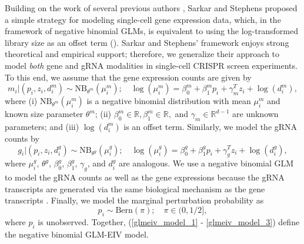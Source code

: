 \documentclass[12pt]{article}
\begin{document}
Building on the work of several previous authors \parencite{Townes2019,Svensson2020,Hafemeister2019}, Sarkar and Stephens proposed a simple strategy for modeling single-cell gene expression data, which, in the framework of negative binomial GLMs, is equivalent to using the log-transformed library size as an offset term (\cite{Sarkar2021}). Sarkar and Stephens' framework enjoys strong theoretical and empirical support; therefore, we generalize their approach to model \textit{both} gene and gRNA modalities in single-cell CRISPR screen experiments. To this end, we assume that the gene expression counts are given by
\begin{equation}\label{glmeiv_model_1}
m_i |(p_i, z_i, d^m_i) \sim \textrm{NB}_{\theta^m}(\mu_i^m); \quad \log(\mu^m_i) = \beta^m_0 + \beta^m_1 p_i + \gamma_m^T z_i + \log(d^m_i),
\end{equation}
where (i) $\textrm{NB}_{\theta^m}(\mu^m_i)$ is a negative binomial distribution with mean $\mu^m_i$ and known size parameter $\theta^m$; (ii) $\beta^m_0 \in \mathbb{R}, \beta^m_1 \in \mathbb{R},$ and $\gamma_m \in  \mathbb{R}^{d-1}$ are unknown parameters; and (iii) $\log(d_i^m)$ is an offset term. Similarly, we model the gRNA counts by
\begin{equation}\label{glmeiv_model_2}
g_i | (p_i, z_i, d^g_i) \sim \textrm{NB}_{\theta^g}\left(\mu_i^g\right); \quad \log(\mu_i^g) = \beta^g_0 + \beta^g_1p_i + \gamma^T_g z_i + \log(d^g_i),
\end{equation}
where $\mu^g_i$, $\theta^g$, $\beta^g_0$, $\beta^g_1$, $\gamma_g$, and $d^g_i$ are analogous. We use a negative binomial GLM to model the gRNA counts as well as the gene expressions because the gRNA transcripts are generated via the same biological mechanism as the gene transcripts \parencite{Datlinger2017,Hill2018}. Finally, we model the marginal perturbation probability as 
\begin{equation}\label{glmeiv_model_3}
 p_i \sim \textrm{Bern}(\pi); \quad \pi \in (0,1/2],
\end{equation}
where $p_i$ is unobserved. Together, (\ref{glmeiv_model_1} - \ref{glmeiv_model_3}) define the negative binomial GLM-EIV model. 
\end{document}
